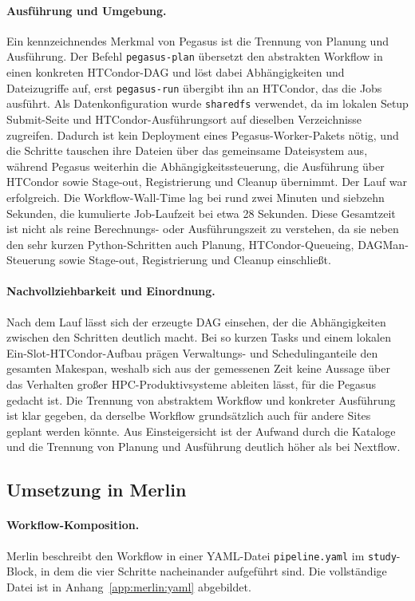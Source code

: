 \paragraph{Ausführung und Umgebung.}
Ein kennzeichnendes Merkmal von Pegasus ist die Trennung von Planung und Ausführung. Der Befehl
\texttt{pegasus-plan} übersetzt den abstrakten Workflow in einen konkreten HTCondor-DAG und löst
dabei Abhängigkeiten und Dateizugriffe auf, erst \texttt{pegasus-run} übergibt ihn an HTCondor,
das die Jobs ausführt. Als Datenkonfiguration wurde \texttt{sharedfs} verwendet, da im lokalen
Setup Submit-Seite und HTCondor-Ausführungsort auf dieselben Verzeichnisse zugreifen. Dadurch ist
kein Deployment eines Pegasus-Worker-Pakets nötig, und die Schritte tauschen ihre Dateien über das
gemeinsame Dateisystem aus, während Pegasus weiterhin die Abhängigkeitssteuerung, die Ausführung
über HTCondor sowie Stage-out, Registrierung und Cleanup übernimmt. Der Lauf war erfolgreich. Die
Workflow-Wall-Time lag bei rund zwei Minuten und siebzehn Sekunden, die kumulierte Job-Laufzeit
bei etwa 28 Sekunden. Diese Gesamtzeit ist nicht als reine Berechnungs- oder Ausführungszeit zu
verstehen, da sie neben den sehr kurzen Python-Schritten auch Planung, HTCondor-Queueing,
DAGMan-Steuerung sowie Stage-out, Registrierung und Cleanup einschließt.

\paragraph{Nachvollziehbarkeit und Einordnung.}
Nach dem Lauf lässt sich der erzeugte DAG einsehen, der die Abhängigkeiten zwischen den Schritten
deutlich macht. Bei so kurzen Tasks und einem lokalen Ein-Slot-HTCondor-Aufbau prägen Verwaltungs-
und Schedulinganteile den gesamten Makespan, weshalb sich aus der gemessenen Zeit keine Aussage
über das Verhalten großer HPC-Produktivsysteme ableiten lässt, für die Pegasus gedacht ist. Die
Trennung von abstraktem Workflow und konkreter Ausführung ist klar gegeben, da derselbe Workflow
grundsätzlich auch für andere Sites geplant werden könnte. Aus Einsteigersicht ist der Aufwand
durch die Kataloge und die Trennung von Planung und Ausführung deutlich höher als bei Nextflow.

\subsection{Umsetzung in Merlin}
\label{sec:practical:pipeline:merlin}

\paragraph{Workflow-Komposition.}
Merlin beschreibt den Workflow in einer YAML-Datei \texttt{pipeline.yaml} im \texttt{study}-Block,
in dem die vier Schritte nacheinander aufgeführt sind. Die vollständige Datei ist in
Anhang~\ref{app:merlin:yaml} abgebildet.

